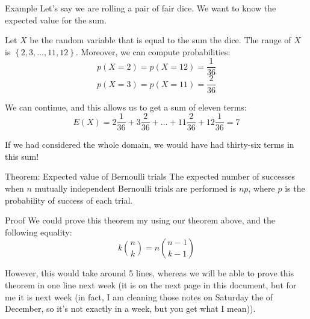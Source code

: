 \documentclass[a4paper]{article}
\begin{document}
\begin{parag}{Example}
    Let's say we are rolling a pair of fair dice. We want to know the expected value for the sum. 

    Let $X$ be the random variable that is equal to the sum the dice. The range of $X$ is $\left\{2, 3, \ldots, 11, 12\right\}$. Moreover, we can compute probabilities: 
    \[p\left(X = 2\right) = p\left(X = 12\right) = \frac{1}{36}\]
    \[p\left(X = 3\right) = p\left(X = 11\right) = \frac{2}{36}\]
    
    We can continue, and this allows us to get a sum of eleven terms: 
    \[E\left(X\right) = 2 \frac{1}{36} + 3 \frac{2}{36} + \ldots + 11 \frac{2}{36} + 12 \frac{1}{36} = 7\]
    
    If we had considered the whole domain, we would have had thirty-six terms in this sum!
\end{parag}

\begin{parag}{Theorem: Expected value of Bernoulli trials}
    The expected number of successes when $n$ mutually independent Bernoulli trials are performed is $np$, where $p$ is the probability of success of each trial.

    \begin{subparag}{Proof}
        We could prove this theorem my using our theorem above, and the following equality: 
        \[k \binom{n}{k} = n \binom{n-1}{k-1}\]
        
        However, this would take around 5 lines, whereas we will be able to prove this theorem in one line next week (it is on the next page in this document, but for me it is next week (in fact, I am cleaning those notes on Saturday the  of December, so it's not exactly in a week, but you get what I mean)).
    \end{subparag}
\end{parag}
\end{document}
